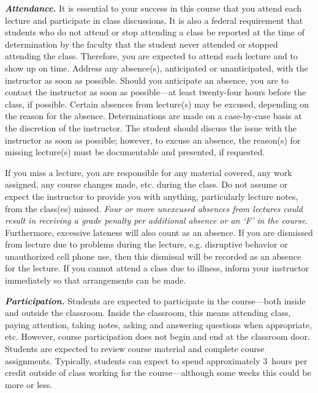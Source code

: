 \documentclass[11pt,letterpaper]{article}
\begin{document}
{\itshape\bfseries\color{stacred}Attendance.} It is essential to your success in this course that you attend each lecture and participate in class discussions. It is also a federal requirement that students who do not attend or stop attending a class be reported at the time of determination by the faculty that the student never attended or stopped attending the class. Therefore, you are expected to attend each lecture and to show up on time. Address any absence(s), anticipated or unanticipated, with the instructor as soon as possible. Should you anticipate an absence, you are to contact the instructor as soon as possible---at least twenty-four hours before the class, if possible.  Certain absences from lecture(s) may be excused, depending on the reason for the absence. Determinations are made on a case-by-case basis at the discretion of the instructor. The student should discuss the issue with the instructor as soon as possible; however, to excuse an absence, the reason(s) for missing lecture(s) must be documentable and presented, if requested. \pspace

If you miss a lecture, you are responsible for any material covered, any work assigned, any course changes made, etc. during the class. Do not assume or expect the instructor to provide you with anything, particularly lecture notes, from the class(es) missed. {\itshape Four or more unexcused absences from lectures could result in receiving a grade penalty per additional absence or an `F' in the course.} Furthermore, excessive lateness will also count as an absence. If you are dismissed from lecture due to problems during the lecture, e.g. disruptive behavior or unauthorized cell phone use, then this dismissal will be recorded as an absence for the lecture. If you cannot attend a class due to illness, inform your instructor immediately so that arrangements can be made. \pspace

{\itshape\bfseries\color{stacred}Participation.} Students are expected to participate in the course---both inside and outside the classroom. Inside the classroom, this means attending class, paying attention, taking notes, asking and answering questions when appropriate, etc. However, course participation does not begin and end at the classroom door. Students are expected to review course material and complete course assignments. Typically, students can expect to spend approximately 3~hours per credit outside of class working for the course---although some weeks this could be more or less. \pspace
\end{document}
